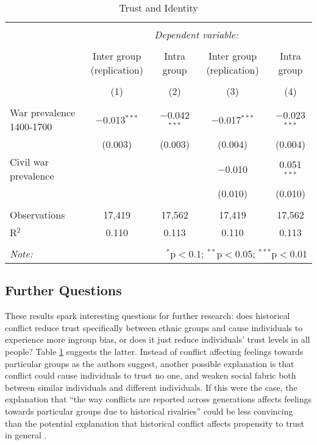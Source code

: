 \begin{table}[!htbp] \centering 
  \caption{Trust and Identity} 
  \label{table:trust} 
\footnotesize 
\begin{tabular}{@{\extracolsep{2pt}}lcccc} 
\\[-1.8ex]\hline 
\hline \\[-1.8ex] 
 & \multicolumn{4}{c}{\textit{Dependent variable:}} \\ 
\cline{2-5} 
\\[-1.8ex] & Inter group (replication) & Intra group & Inter group (replication) & Intra group \\ 
\\[-1.8ex] & (1) & (2) & (3) & (4)\\ 
\hline \\[-1.8ex] 
 War prevalence 1400-1700 & $-$0.013$^{***}$ & $-$0.042$^{***}$ & $-$0.017$^{***}$ & $-$0.023$^{***}$ \\ 
  & (0.003) & (0.003) & (0.004) & (0.004) \\ 
  Civil war prevalence &  &  & $-$0.010 & 0.051$^{***}$ \\ 
  &  &  & (0.010) & (0.010) \\ 
 \hline \\[-1.8ex] 
Observations & 17,419 & 17,562 & 17,419 & 17,562 \\ 
R$^{2}$ & 0.110 & 0.113 & 0.110 & 0.113 \\ 
\hline 
\hline \\[-1.8ex] 
\textit{Note:}  & \multicolumn{4}{r}{$^{*}$p$<$0.1; $^{**}$p$<$0.05; $^{***}$p$<$0.01} \\ 
\end{tabular} 
\end{table} 

\subsection{Further Questions} 

These results spark interesting questions for further research: does historical conflict reduce trust specifically between ethnic groups and cause individuals to experience more ingroup bias, or does it just reduce individuals' trust levels in all people? Table \ref{table:trust} suggests the latter. Instead of conflict affecting feelings towards particular groups as the authors suggest, another possible explanation is that conflict could cause individuals to trust no one, and weaken social fabric both between similar individuals and different individuals. If this were the case, the explanation that ``the way conflicts are reported across generations affects feelings towards particular groups due to historical rivalries'' could be less convincing than the potential explanation that historical conflict affects propensity to trust in general \citep{BesleyRQ2014}. 

